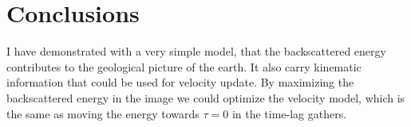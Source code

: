 \section{Conclusions}
I have demonstrated with a very simple model, that the backscattered
energy contributes to the geological picture of the earth. It also carry kinematic
information that could be used for velocity update.  By maximizing the 
backscattered energy in the image we could optimize the velocity model, which is the 
same as moving the energy towards $\tau=0$ in the time-lag gathers.